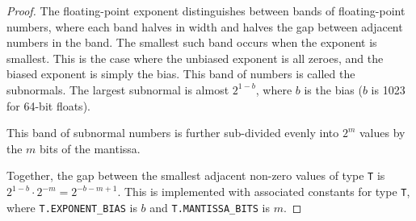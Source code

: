 \documentclass{article}
\begin{document}
\begin{proof}
    The floating-point exponent distinguishes between bands of floating-point numbers,
    where each band halves in width and halves the gap between adjacent numbers in the band.
    The smallest such band occurs when the exponent is smallest.
    This is the case where the unbiased exponent is all zeroes, 
    and the biased exponent is simply the bias.
    This band of numbers is called the subnormals.
    The largest subnormal is almost $2^{1-b}$, where $b$ is the bias ($b$ is 1023 for 64-bit floats).

    This band of subnormal numbers is further sub-divided evenly into $2^m$ values by the $m$ bits of the mantissa.

    Together, the gap between the smallest adjacent non-zero values of type \texttt{T} is $2^{1-b} \cdot 2^{-m} = 2^{-b-m+1}$.
    This is implemented with associated constants for type \texttt{T}, 
    where \texttt{T.EXPONENT\_BIAS} is $b$ and \texttt{T.MANTISSA\_BITS} is $m$.
\end{proof}
\end{document}
